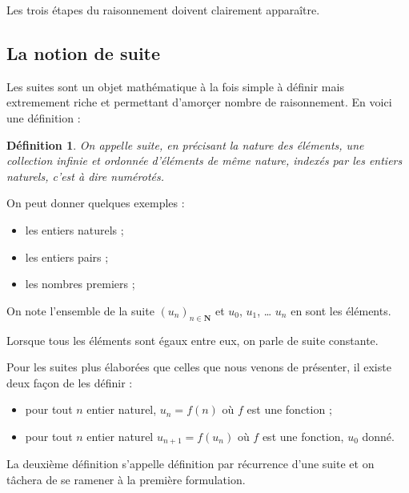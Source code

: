 \documentclass[12pt,a4paper]{article}
\newcommand{\N}{\mathbf{N}}
\theoremstyle{break}
\newtheorem{definition}{Définition}
\theoremstyle{plain}
\theoremstyle{nonumberplain}
\theoremstyle{nonumberbreak}
\begin{document}
Les trois étapes du raisonnement doivent clairement apparaître.

\subsection{La notion de suite}

Les suites sont un objet mathématique à la fois simple à définir mais
extremement riche et permettant d'amorçer nombre de raisonnement. En
voici une définition :
\begin{definition}
  On appelle \emph{suite}, en précisant la nature des éléments, une
  collection infinie et ordonnée d'éléments de même nature, indexés par
  les entiers naturels, c'est à dire numérotés.
\end{definition}

On peut donner quelques exemples :
\begin{itemize}
  \item les entiers naturels ;
  \item les entiers pairs ;
  \item les nombres premiers ;
\end{itemize}

On note l'ensemble de la suite $(u_n)_{n\in\N}$ et $u_0$, $u_1$, \dots
$u_n$ en sont les éléments.

Lorsque tous les éléments sont égaux entre eux, on parle de suite
constante.

Pour les suites plus élaborées que celles que nous venons de présenter,
il existe deux façon de les définir :
\begin{itemize}
  \item pour tout $n$ entier naturel, $u_n = f(n)$ où $f$ est une
    fonction ;
  \item pour tout $n$ entier naturel $u_{n+1} = f(u_n)$ où $f$ est une
    fonction, $u_0$ donné.
\end{itemize}
La deuxième définition s'appelle définition par récurrence d'une suite
et on tâchera de se ramener à la première formulation.

\end{document}
